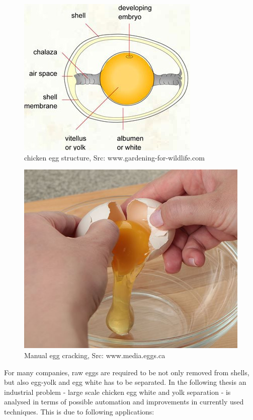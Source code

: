 \documentclass[12pt,twoside,a4paper]{article}
\begin{document}
\begin{figure}[H]
\centering
\includegraphics[width=0.4\paperwidth]{structure}
\caption{chicken egg structure, Src: www.gardening-for-wildlife.com}\label{fig:structure}\label{fig:structure}
\end{figure}


\begin{figure}[H]
\centering
\includegraphics[width=0.4\paperwidth]{crack}
\caption{Manual egg cracking, Src: www.media.eggs.ca}\label{fig:crack}
\end{figure}
\newpage 
For many companies, raw eggs are required to be not only removed from shells, but also egg-yolk and egg white has to be separated.
In the following thesis an industrial problem - large scale chicken egg white and yolk separation - is analysed in terms of possible automation and improvements in currently used techniques. This is due to following applications:
\end{document}
